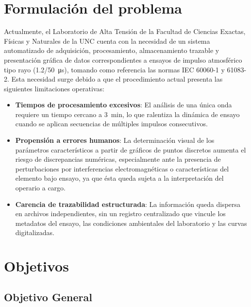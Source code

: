 \section{Formulación del problema}
\label{sec:formulacion_problema}
\vspace{3\baselineskip}

Actualmente, el Laboratorio de Alta Tensión de la Facultad de Ciencias Exactas, Físicas y Naturales de la UNC cuenta con la necesidad de un sistema automatizado de adquisición, procesamiento, almacenamiento trazable y presentación gráfica de datos correspondientes a ensayos de impulso atmosférico tipo rayo (\qty[parse-numbers=false]{1.2/50}{\micro\second}), tomando como referencia las normas IEC 60060-1 y 61083-2. Esta necesidad surge debido a que el procedimiento actual presenta las siguientes limitaciones operativas:

\begin{itemize}
    \item \textbf{Tiempos de procesamiento excesivos}: El análisis de una única onda requiere un tiempo cercano a \qty{3}{\minute}, lo que ralentiza la dinámica de ensayo cuando se aplican secuencias de múltiples impulsos consecutivos.
    \item \textbf{Propensión a errores humanos}: La determinación visual de los parámetros característicos a partir de gráficos de puntos discretos aumenta el riesgo de discrepancias numéricas, especialmente ante la presencia de perturbaciones por interferencias electromagnéticas o características del elemento bajo ensayo, ya que ésta queda sujeta a la interpretación del operario a cargo.
    \item \textbf{Carencia de trazabilidad estructurada}: La información queda dispersa en archivos independientes, sin un registro centralizado que vincule los metadatos del ensayo, las condiciones ambientales del laboratorio y las curvas digitalizadas.
\end{itemize}

\section{Objetivos}
\label{sec:objetivos}
\vspace{3\baselineskip}

\subsection{Objetivo General}
\label{subsec:objetivo_general}

